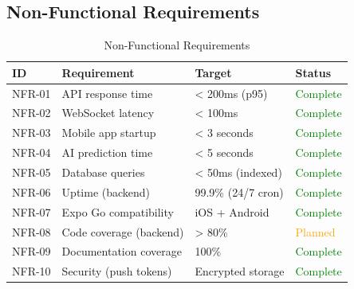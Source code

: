 \documentclass[12pt,a4paper,oneside]{article}
\begin{document}
\subsection{Non-Functional Requirements}
\begin{table}[H]
    \centering
    \begin{tabularx}{\textwidth}{llll}
        \toprule
        \textbf{ID} & \textbf{Requirement} & \textbf{Target} & \textbf{Status} \\
        \midrule
        NFR-01 & API response time & < 200ms (p95) & \textcolor{green}{Complete} \\
        NFR-02 & WebSocket latency & < 100ms & \textcolor{green}{Complete} \\
        NFR-03 & Mobile app startup & < 3 seconds & \textcolor{green}{Complete} \\
        NFR-04 & AI prediction time & < 5 seconds & \textcolor{green}{Complete} \\
        NFR-05 & Database queries & < 50ms (indexed) & \textcolor{green}{Complete} \\
        NFR-06 & Uptime (backend) & 99.9\% (24/7 cron) & \textcolor{green}{Complete} \\
        NFR-07 & Expo Go compatibility & iOS + Android & \textcolor{green}{Complete} \\
        NFR-08 & Code coverage (backend) & > 80\% & \textcolor{orange}{Planned} \\
        NFR-09 & Documentation coverage & 100\% & \textcolor{green}{Complete} \\
        NFR-10 & Security (push tokens) & Encrypted storage & \textcolor{green}{Complete} \\
        \bottomrule
    \end{tabularx}
    \caption{Non-Functional Requirements}
\end{table}
\end{document}
